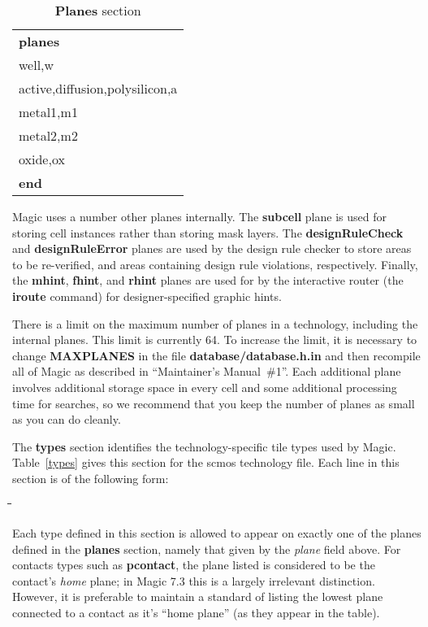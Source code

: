 \documentclass[letterpaper,twoside,12pt]{article}
\def\hinch{\hspace*{0.5in}}
\def\starti{\begin{center}\begin{tabbing}\hinch\=\hinch\=\hinch\=\hinch\=\kill}
\def\endi{\end{tabbing}\end{center}}
\def\ii{\>\>\>}
\begin{document}
\begin{table}[ht]
   \begin{center}
      \begin{tabular}{|l|} \hline
	  {\bfseries planes} \\
	  well,w \\
	  active,diffusion,polysilicon,a \\
	  metal1,m1 \\
	  metal2,m2 \\
	  oxide,ox \\
	  {\bfseries end} \\ \hline
      \end{tabular}
      \caption{{\bfseries Planes} section}
      \label{planes}
   \end{center}
\end{table}

Magic uses a number other planes internally.
The {\bfseries subcell}
plane is used for storing cell instances rather than storing
mask layers.
The {\bfseries designRuleCheck} and {\bfseries designRuleError}
planes are used by the design rule checker to store
areas to be re-verified, and areas containing design rule
violations, respectively.
Finally, the {\bfseries mhint}, {\bfseries fhint}, and {\bfseries rhint}  planes are
used for by the interactive
router (the {\bfseries iroute} command) for designer-specified graphic hints.

There is a limit on the maximum number of planes in a technology,
including the internal planes.  This limit is currently 64.
To increase the limit, it is necessary to change {\bfseries MAXPLANES}
in the file
{\bfseries database/database.h.in} and then recompile all
of Magic as described in ``Maintainer's Manual\ \#1''.  Each additional
plane involves additional storage space in every cell and some additional
processing time for searches, so we recommend that you keep the number
of planes as small as you can do cleanly.

The {\bfseries types} section identifies the technology-specific
tile types used by Magic.
Table~\ref{types} gives this section for the scmos technology file.
Each line in this section is of the following form:

\starti
  \ii {\itshape plane names}
\endi

Each type defined in this section is allowed to appear on exactly
one of the planes defined in the {\bfseries planes} section, namely
that given by the {\itshape plane} field above.
For contacts types such as {\bfseries pcontact}, the plane
listed is considered to be the contact's {\itshape home} plane;
in Magic 7.3 this is a largely irrelevant distinction.  However,
it is preferable to maintain a standard of listing the lowest plane
connected to a contact as it's ``home plane'' (as they appear in
the table).
\end{document}
